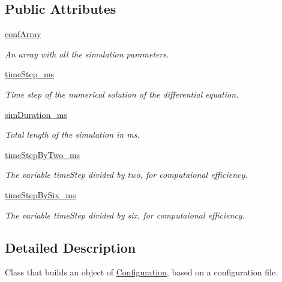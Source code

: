 \subsection*{Public Attributes}
\begin{DoxyCompactItemize}
\item 
\hyperlink{class_configuration_1_1_configuration_a2b8c2d210ef82ba5088de3c8c9a8725d}{conf\+Array}
\begin{DoxyCompactList}\small\item\em An array with all the simulation parameters. \end{DoxyCompactList}\item 
\hyperlink{class_configuration_1_1_configuration_a6379aaa6e54523ca81e3713d1846679b}{time\+Step\+\_\+ms}
\begin{DoxyCompactList}\small\item\em Time step of the numerical solution of the differential equation. \end{DoxyCompactList}\item 
\hyperlink{class_configuration_1_1_configuration_aea238884fe3daa1287aa069f35d4ad3e}{sim\+Duration\+\_\+ms}
\begin{DoxyCompactList}\small\item\em Total length of the simulation in ms. \end{DoxyCompactList}\item 
\hyperlink{class_configuration_1_1_configuration_a58f6e3bf5491f8fb229697fc3690aa12}{time\+Step\+By\+Two\+\_\+ms}
\begin{DoxyCompactList}\small\item\em The variable time\+Step divided by two, for computaional efficiency. \end{DoxyCompactList}\item 
\hyperlink{class_configuration_1_1_configuration_aa49387a016f5d528136ab5812821cb99}{time\+Step\+By\+Six\+\_\+ms}
\begin{DoxyCompactList}\small\item\em The variable time\+Step divided by six, for computaional efficiency. \end{DoxyCompactList}\end{DoxyCompactItemize}


\subsection{Detailed Description}
Class that builds an object of \hyperlink{class_configuration_1_1_configuration}{Configuration}, based on a configuration file. 

